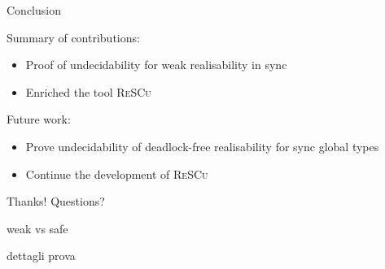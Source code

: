 \documentclass{beamer}
\begin{document}



\begin{frame}[fragile]{Conclusion}

	Summary of contributions:
	\begin{itemize}
		\item Proof of undecidability for weak realisability in sync
		\item Enriched the tool \textsc{ReSCu} 
	\end{itemize}

	\bigskip

	Future work:
	\begin{itemize}
		\item Prove undecidability of deadlock-free realisability for sync global types
		\item Continue the development of \textsc{ReSCu}
	\end{itemize}

	\bigskip

	\begin{center}
		\Large Thanks! Questions?
	\end{center}
\end{frame}

\begin{frame}
	weak vs safe
\end{frame}

\begin{frame}
	dettagli prova
\end{frame}
\end{document}
